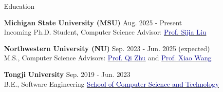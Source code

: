 \begin{rSection}{Education}
\small{{\bf Michigan State University (MSU)} \hfill Aug. 2025 - Present
\\ Incoming Ph.D. Student, Computer Science \hfill Advisor: \href{https://lsjxjtu.github.io/index.html}{\textcolor{darkblue}{Prof. Sijia Liu}} 

\vspace{-2mm}
{\bf Northwestern University (NU)} \hfill Sep. 2023 - Jun. 2025 (expected)
\\ M.S., Computer Science \hfill Advisors:  \href{https://scholar.google.com/citations?user=TN09YMcAAAAJ&hl=en}{\textcolor{darkblue}{Prof. Qi Zhu}} and \href{https://wangxiao1254.github.io/}{\textcolor{darkblue}{Prof. Xiao Wang}}

\vspace{-2mm}
{\bf Tongji University} \hfill Sep. 2019 - Jun. 2023
\\ B.E., Software Engineering \hfill \href{https://cs.tongji.edu.cn/}{\textcolor{darkblue}{School of Computer Science and Technology}}} \\
\vspace{-5.0mm}

\end{rSection}
